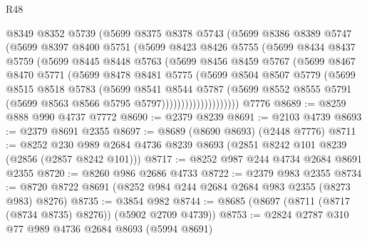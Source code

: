 \begin{lexlean}{R48}
\begin{coremodule}
                @8349
                @8352
                @5739
                (@5699
                  @8375
                  @8378
                  @5743
                  (@5699
                    @8386
                    @8389
                    @5747
                    (@5699
                      @8397
                      @8400
                      @5751
                      (@5699
                        @8423
                        @8426
                        @5755
                        (@5699
                          @8434
                          @8437
                          @5759
                          (@5699
                            @8445
                            @8448
                            @5763
                            (@5699
                              @8456
                              @8459
                              @5767
                              (@5699
                                @8467
                                @8470
                                @5771
                                (@5699
                                  @8478
                                  @8481
                                  @5775
                                  (@5699
                                    @8504
                                    @8507
                                    @5779
                                    (@5699
                                      @8515
                                      @8518
                                      @5783
                                      (@5699
                                        @8541
                                        @8544
                                        @5787
                                        (@5699
                                          @8552
                                          @8555
                                          @5791
                                          (@5699 @8563 @8566 @5795 @5797))))))))))))))))))))
    @7776
@8689 := @8259 @888 @990 @4737 @7772
@8690 := @2379 @8239
@8691 := @2103 @4739
@8693 := @2379 @8691 @2355
@8697 := @8689 (@8690 @8693) (@2448 @7776)
@8711 := @8252 @230 @989 @2684 @4736 @8239 @8693 (@2851 @8242 @101 @8239 (@2856 (@2857 @8242 @101)))
@8717 := @8252 @987 @244 @4734 @2684 @8691 @2355
@8720 := @8260 @986 @2686 @4733
@8722 := @2379 @983 @2355
@8734 := @8720 @8722 @8691 (@8252 @984 @244 @2684 @2684 @983 @2355 (@8273 @983) @8276)
@8735 := @3854 @982
@8744 := @8685 (@8697 (@8711 (@8717 (@8734 @8735) @8276)) (@5902 @2709 @4739))
@8753 := @2824 @2787 @310 @77 @989 @4736 @2684 @8693 (@5994 @8691)

\end{coremodule}
\end{lexlean}
